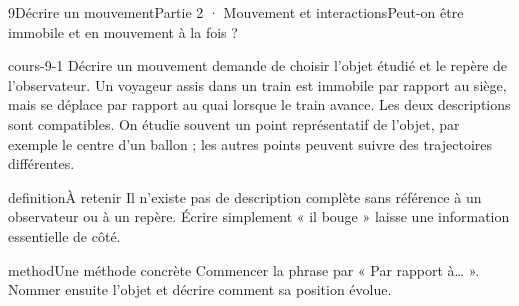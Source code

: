 \documentclass[12pt,twoside,openany]{book}
\begin{document}
\clearpage\pagestyle{otMain}
\begin{ouverture}[college2]{9}{Décrire un mouvement}{Partie 2 · Mouvement et interactions}{Peut-on être immobile et en mouvement à la fois ?}
\end{ouverture}
\label{ch-9-cours-1}
\label{ess-9}
\begin{pcFiche}{cours-9-1}
Décrire un mouvement demande de choisir l’objet étudié et le repère de l’observateur. Un voyageur assis dans un train est immobile par rapport au siège, mais se déplace par rapport au quai lorsque le train avance. Les deux descriptions sont compatibles. On étudie souvent un point représentatif de l’objet, par exemple le centre d’un ballon ; les autres points peuvent suivre des trajectoires différentes.\par
{}
\begin{pcEncadre}{definition}{À retenir}
Il n’existe pas de description complète sans référence à un observateur ou à un repère. Écrire simplement « il bouge » laisse une information essentielle de côté.\par
\end{pcEncadre}
\begin{pcEncadre}{method}{Une méthode concrète}
Commencer la phrase par « Par rapport à… ». Nommer ensuite l’objet et décrire comment sa position évolue.\par
\end{pcEncadre}
\end{pcFiche}
\label{ch-9-cours-2}
\end{document}
